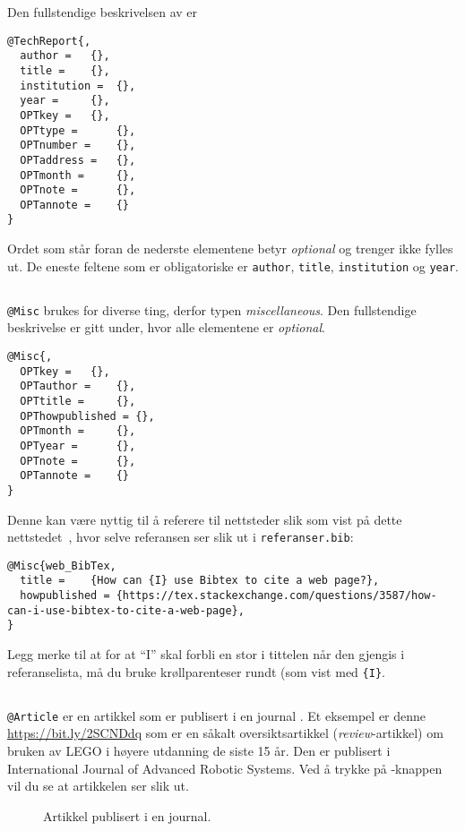 Den fullstendige beskrivelsen av  er
\begin{verbatim}
@TechReport{,
  author = 	 {},
  title = 	 {},
  institution =  {},
  year = 	 {},
  OPTkey = 	 {},
  OPTtype = 	 {},
  OPTnumber = 	 {},
  OPTaddress = 	 {},
  OPTmonth = 	 {},
  OPTnote = 	 {},
  OPTannote = 	 {}
}
\end{verbatim}
Ordet  som står foran de nederste elementene betyr {\em
  optional} og trenger ikke fylles ut. De eneste feltene som er
obligatoriske er {\tt author}, {\tt title}, {\tt institution} og {\tt year}.

\newpage

\subsection{}
{\tt @Misc} brukes for diverse ting, derfor typen {\em
  miscellaneous}. Den fullstendige beskrivelse er gitt under, hvor
alle elementene er {\em optional}. 

\begin{verbatim}
@Misc{,
  OPTkey = 	 {},
  OPTauthor = 	 {},
  OPTtitle = 	 {},
  OPThowpublished = {},
  OPTmonth = 	 {},
  OPTyear = 	 {},
  OPTnote = 	 {},
  OPTannote = 	 {}
}
\end{verbatim}

Denne kan være nyttig til å referere til nettsteder slik som vist på
dette nettstedet~\cite{web_BibTex}, hvor selve referansen ser slik ut i
{\tt referanser.bib}:

\begin{boxedminipage}{200mm}
\begin{verbatim}
@Misc{web_BibTex,
  title = 	 {How can {I} use Bibtex to cite a web page?},
  howpublished = {https://tex.stackexchange.com/questions/3587/how-can-i-use-bibtex-to-cite-a-web-page},
}
\end{verbatim}
\end{boxedminipage}


Legg merke til at for at ``I'' skal forbli en stor i tittelen når den
gjengis i referanselista, må du 
bruke krøllparenteser rundt (som vist med {\tt \{I\}}. 


\newpage

\subsection{}
{\tt @Article} er en artikkel som er publisert i en journal
. Et eksempel er denne
  {\color{red}\href{https://bit.ly/2SCNDdq}{https://bit.ly/2SCNDdq}}
  som er en såkalt oversiktsartikkel ({\em review}-artikkel) 
  om bruken av  LEGO i høyere
  utdanning de siste 15 år. Den er publisert i International Journal
  of Advanced Robotic Systems.
Ved å trykke på
  {\color{red}{Download PDF}}-knappen vil du se at artikkelen ser
  slik ut.
\begin{figure}[H]
  \centering
  \caption{Artikkel publisert i en journal.} 
  \label{fig:article}
\end{figure}

